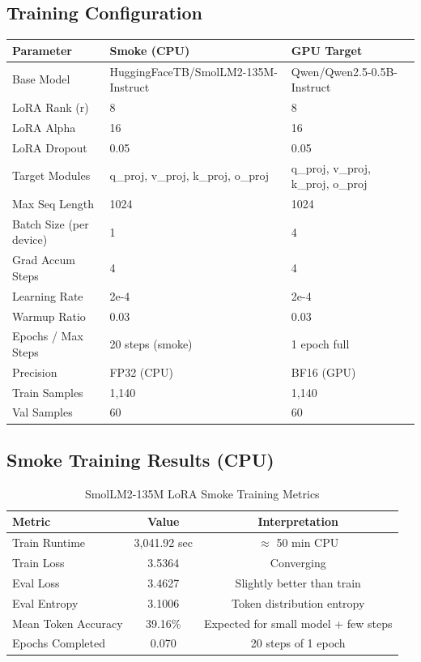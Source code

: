 \documentclass[11pt,a4paper]{article}
\begin{document}
\subsection{Training Configuration}
\begin{nvidiabox}
\begin{tabular}{>{\color{nvidiaWhite}}l >{\color{nvidiaWhite}}l >{\color{nvidiaWhite}}l}
\rowcolor{tableHeader}
\textbf{Parameter} & \textbf{Smoke (CPU)} & \textbf{GPU Target} \\
\midrule
Base Model & HuggingFaceTB/SmolLM2-135M-Instruct & Qwen/Qwen2.5-0.5B-Instruct \\
LoRA Rank (r) & 8 & 8 \\
LoRA Alpha & 16 & 16 \\
LoRA Dropout & 0.05 & 0.05 \\
Target Modules & q\_proj, v\_proj, k\_proj, o\_proj & q\_proj, v\_proj, k\_proj, o\_proj \\
Max Seq Length & 1024 & 1024 \\
Batch Size (per device) & 1 & 4 \\
Grad Accum Steps & 4 & 4 \\
Learning Rate & 2e-4 & 2e-4 \\
Warmup Ratio & 0.03 & 0.03 \\
Epochs / Max Steps & 20 steps (smoke) & 1 epoch full \\
Precision & FP32 (CPU) & BF16 (GPU) \\
Train Samples & 1,140 & 1,140 \\
Val Samples & 60 & 60 \\
\bottomrule
\end{tabular}
\end{nvidiabox}

\subsection{Smoke Training Results (CPU)}
\begin{table}[H]
\centering
\caption{SmolLM2-135M LoRA Smoke Training Metrics}
\label{tab:smoke_training}
\begin{tabular}{>{\color{nvidiaWhite}}l >{\color{nvidiaWhite}}c >{\color{nvidiaWhite}}c}
\rowcolor{tableHeader}
\textbf{Metric} & \textbf{Value} & \textbf{Interpretation} \\
\midrule
Train Runtime & 3,041.92 sec & $\approx$ 50 min CPU \\
Train Loss & 3.5364 & Converging \\
Eval Loss & 3.4627 & Slightly better than train \\
Eval Entropy & 3.1006 & Token distribution entropy \\
Mean Token Accuracy & 39.16\% & Expected for small model + few steps \\
Epochs Completed & 0.070 & 20 steps of 1 epoch \\
\bottomrule
\end{tabular}
\end{table}
\end{document}
